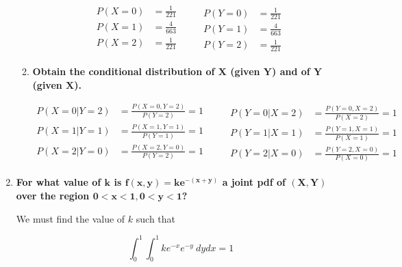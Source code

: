 \documentclass[10pt, oneside]{article}   	%
\theoremstyle{definition}
\begin{document}
\begin{enumerate}[label=6.\arabic*]
\begin{enumerate}
	\[
	\begin{aligned}
	P(X = 0) &= \boxed{\frac{1}{221}} \\
	P(X = 1) &= \boxed{\frac{4}{663}} \\
	P(X = 2) &= \boxed{\frac{1}{221}} \\
	\end{aligned}
	\qquad
	\begin{aligned}
	P(Y = 0) &= \boxed{\frac{1}{221}} \\
	P(Y = 1) &= \boxed{\frac{4}{663}} \\
	P(Y = 2) &= \boxed{\frac{1}{221}}
	\end{aligned} \]
	
	\item  \begin{tcolorbox}[
	  colback=Cerulean!5!white,
	  colframe=Cerulean!75!black]
	\textbf{Obtain the conditional distribution of $\bm{X}$ (given $\bm{Y}$) and of $\bm{Y}$ (given $\bm{X}$).}
	\end{tcolorbox}
	
	\[
	\begin{aligned}
	P(X = 0 | Y = 2) &= \frac{P(X = 0, Y = 2)}{P(Y = 2)} = \boxed{1} \\
	P(X = 1 | Y = 1) &= \frac{P(X = 1, Y = 1)}{P(Y = 1)} = \boxed{1} \\
	P(X = 2 | Y = 0) &= \frac{P(X = 2, Y = 0)}{P(Y = 2)} = \boxed{1} \\
	\end{aligned}
	\qquad
	\begin{aligned}
	P(Y = 0 | X = 2) &= \frac{P(Y = 0, X = 2)}{P(X = 2)} = \boxed{1} \\
	P(Y = 1 | X = 1) &= \frac{P(Y = 1, X = 1)}{P(X = 1)} = \boxed{1} \\
	P(Y = 2 | X = 0) &= \frac{P(Y = 2, X = 0)}{P(X = 0)} = \boxed{1}
	\end{aligned} \]
	
	\end{enumerate}

\item  \begin{tcolorbox}[
  colback=Cerulean!5!white,
  colframe=Cerulean!75!black]
\textbf{For what value of $\bm{k}$ is $\bm{f(x,y) = ke^{-(x+y)}}$ a joint pdf of $\bm{(X,Y)}$ over the region $\bm{0 < x < 1, 0 < y < 1}$?}
\end{tcolorbox}

We must find the value of $k$ such that

\[ \int^1_0 \int^1_0 ke^{-x} e^{-y} \ dy dx = 1 \]


\end{enumerate}
\end{document}
